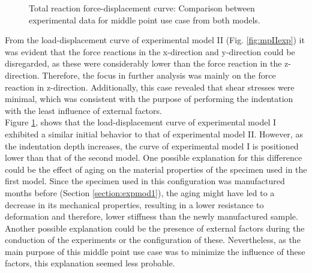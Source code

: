 \begin{figure}%
    \centering
   \quad
   \caption[Middle point experimental data]{Total reaction force-displacement curve: Comparison between experimental data for middle point use case from both models.}%
   \label{fig:midpointexpIvsexpII}%
\end{figure}

From the load-displacement curve of experimental model II (Fig. \ref{fig:mpIIexp}) it was evident that the
force reactions in the x-direction and y-direction could be disregarded, as these were considerably lower than
the force reaction in the z-direction. Therefore, the focus in further analysis was mainly 
on the force reaction in z-direction. Additionally, this case revealed that shear stresses were minimal, 
which was consistent with the purpose of performing the indentation with the least influence of external factors.\\

Figure \ref{fig:midpointexpIvsexpII}, shows that the load-displacement curve
of experimental model I exhibited a similar initial behavior to that of experimental model II.
However, as the indentation depth increases, the curve of experimental model I is positioned 
lower than that of the second model. One possible explanation for this difference could be the effect of aging 
on the material properties of the specimen used in the first model. Since the specimen used in this 
configuration was manufactured months before (Section \ref{section:expmod1}), the aging might have
led to a decrease in its mechanical properties, resulting in a lower resistance to deformation
and therefore, lower stiffness than the newly manufactured sample.
Another possible explanation could be the presence of external factors during the conduction of 
the experiments or the configuration of these. Nevertheless, as the main purpose of this middle point 
use case was to minimize the influence of these factors, this explanation seemed less probable.

